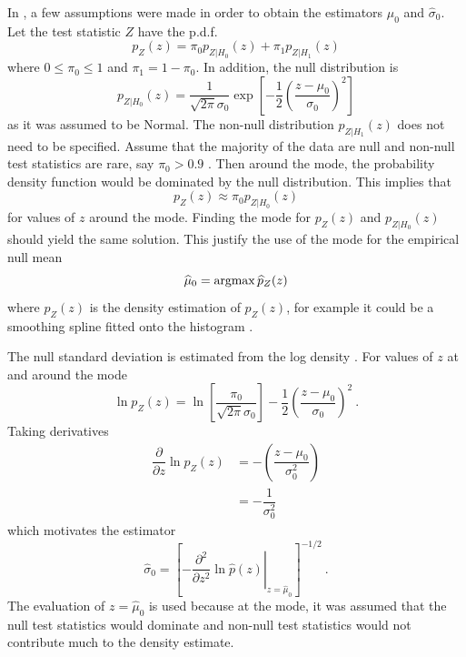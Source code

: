 In \cite{efron2004large}, a few assumptions were made in order to obtain the estimators $\widehat{\mu}_0$ and $\widehat{\sigma}_0$. Let the test statistic $Z$ have the p.d.f.
\begin{equation}
  p_Z(z) =
  \pi_0 p_{Z|H_0}(z) + \pi_1 p_{Z|H_1}(z)
\end{equation}
where $0\leqslant\pi_0\leqslant 1$ and  $\pi_1 = 1-\pi_0$. In addition, the null distribution is
\begin{equation}
  p_{Z|H_0}(z) = 
  \dfrac{1}{\sqrt{2\pi}\sigma_0}
  \exp\left[
    -\dfrac{1}{2}
    \left(
      \dfrac{z-{\mu}_0}{\sigma_0}
    \right)^2
  \right]
\end{equation}
as it was assumed to be Normal. The non-null distribution $p_{Z|H_1}(z)$ does not need to be specified. Assume that the majority of the data are null and non-null test statistics are rare, say $\pi_0>0.9$ \citep{efron2004large}. Then around the mode, the probability density function would be dominated by the null distribution. This implies that
\begin{equation}
  p_{Z}(z) \approx \pi_0 p_{Z|H_0}(z)
\end{equation}
for values of $z$ around the mode. Finding the mode for $p_{Z}(z)$ and $p_{Z|H_0}(z)$ should yield the same solution. This justify the use of the mode for the empirical null mean \citep{efron2004large}
\begin{equation}
  \widehat{\mu}_0 = \operatorname*{argmax}\widehat{p}_Z(z)
\end{equation}
where $\widehat{p}_Z(z)$ is the density estimation of $p_Z(z)$, for example it could be a smoothing spline fitted onto the histogram \citep{efron2004large}.

The null standard deviation is estimated from the log density \citep{efron2004large}. For values of $z$ at and around the mode
\begin{equation}
  \ln p_{Z}(z) = 
  \ln\left[
    \dfrac{\pi_0}{\sqrt{2\pi}{\sigma}_0}
  \right]
  -\dfrac{1}{2}
  \left(
    \dfrac{z-{\mu}_0}{{\sigma}_0}
  \right)^2
  \ .
\end{equation}
Taking derivatives
\begin{align}
  \dfrac{\partial}{\partial z} \ln p_{Z}(z) &=
  -\left(
    \dfrac{
      z-{\mu}_0
    }
    {
      {\sigma}_0^2
    }
  \right)
  \nonumber\\
  &=
  -\dfrac{
    1
  }
  {
    {\sigma}_0^2
  }
\end{align}
which motivates the estimator \citep{efron2004large}
\begin{equation}
  \widehat{\sigma}_0 = \left[
    \left.
      -\dfrac{\partial^2}{\partial z^2}\ln\widehat{p}(z)
    \right|_{z=\widehat{\mu}_0}
  \right]^{-1/2}
  \ .
  \label{eq:inference_nullStdEstimator}
\end{equation}
The evaluation of $z=\widehat{\mu}_0$ is used because at the mode, it was assumed that the null test statistics would dominate and non-null test statistics would not contribute much to the density estimate.

